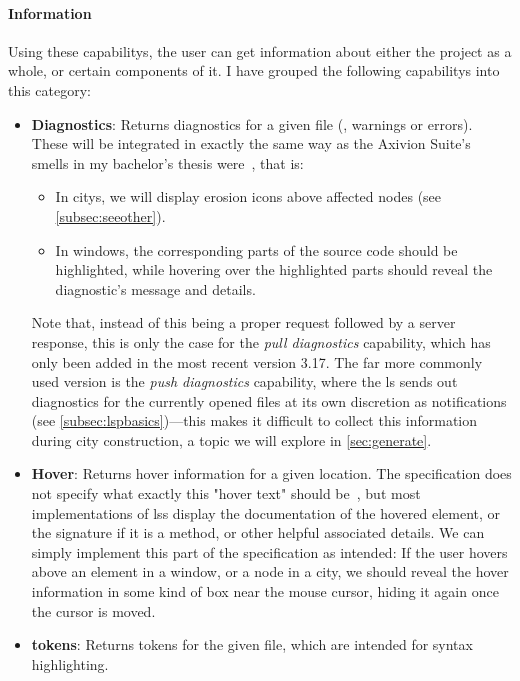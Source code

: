 \documentclass[../thesis]{subfiles}
\begin{document}
\paragraph{Information}
Using these \glspl{capability}, the user can get information about either the project as a whole, or certain components of it.
I have grouped the following \glspl{capability} into this category:
\begin{itemize}
	\item \textbf{Diagnostics}: Returns diagnostics for a given file (\eg, warnings or errors).
	      These will be integrated in exactly the same way as the Axivion Suite's \glspl{smell} in my bachelor's thesis were~\cite{galperin2021}, that is:
	      \begin{itemize}
		      \item In \glspl{city}, we will display erosion icons above affected nodes (see \cref{subsec:seeother}).
		      \item In \glspl{window}, the corresponding parts of the source code should be highlighted, while hovering over the highlighted parts should reveal the diagnostic's message and details.
	      \end{itemize}
	      Note that, instead of this being a proper request followed by a server response, this is only the case for the \emph{pull diagnostics} \gls{capability}, which has only been added in the most recent version 3.17.
	      The far more commonly used version is the \emph{push diagnostics} \gls{capability}, where the \gls{ls} sends out diagnostics for the currently opened files at its own discretion as notifications (see \cref{subsec:lspbasics})---this makes it difficult to collect this information during city construction, a topic we will explore in \cref{sec:generate}.
	\item \textbf{Hover}: Returns hover information for a given location.
	      The specification does not specify what exactly this "hover text" should be~\cite{lsp}, but most implementations of \glspl{ls} display the documentation of the hovered element, or the signature if it is a method, or other helpful associated details.
	      We can simply implement this part of the specification as intended:
	      If the user hovers above an element in a \gls{window}, or a node in a \gls{city}, we should reveal the hover information in some kind of box near the mouse cursor, hiding it again once the cursor is moved.
	\item \textbf{\Glspl*{token}}: Returns \glspl*{token} for the given file, which are intended for syntax highlighting.

\end{itemize}
\end{document}
